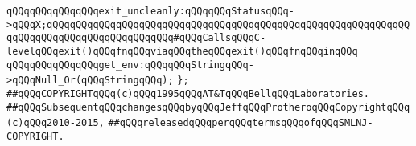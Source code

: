\verb|qQQqqQQqqQQqqQQqexit_uncleanly:qQQqqQQqStatusqQQq->qQQqX;qQQqqQQqqQQqqQQqqQQqqQQqqQQqqQQqqQQqqQQqqQQqqQQqqQQqqQQqqQQqqQQqqQQqqQQqqQQqqQQqqQQqqQQqqQQq#qQQqCallsqQQqC-levelqQQqexit()qQQqfnqQQqviaqQQqtheqQQqexit()qQQqfnqQQqinqQQq|\newline
\newline
\verb|qQQqqQQqqQQqqQQqget_env:qQQqqQQqStringqQQq->qQQqNull_Or(qQQqStringqQQq);|\newline
\newline
\verb|};|\newline
\newline
\newline
\verb|##qQQqCOPYRIGHTqQQq(c)qQQq1995qQQqAT&TqQQqBellqQQqLaboratories.|\newline
\verb|##qQQqSubsequentqQQqchangesqQQqbyqQQqJeffqQQqProtheroqQQqCopyrightqQQq(c)qQQq2010-2015,|\newline
\verb|##qQQqreleasedqQQqperqQQqtermsqQQqofqQQqSMLNJ-COPYRIGHT.|\newline

